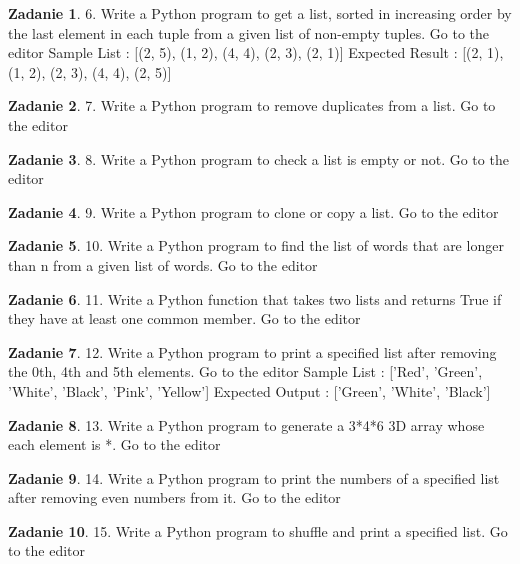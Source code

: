 \documentclass[11pt]{article}
\theoremstyle{definition}
\newtheorem{zadanie}{Zadanie}
\begin{document}
\begin{zadanie}
6. Write a Python program to get a list, sorted in increasing order by the last element in each tuple from a given list of non-empty tuples. Go to the editor
Sample List : [(2, 5), (1, 2), (4, 4), (2, 3), (2, 1)]
Expected Result : [(2, 1), (1, 2), (2, 3), (4, 4), (2, 5)]
\end{zadanie}

\begin{zadanie}
7. Write a Python program to remove duplicates from a list. Go to the editor
\end{zadanie}

\begin{zadanie}
8. Write a Python program to check a list is empty or not. Go to the editor
\end{zadanie}

\begin{zadanie}
9. Write a Python program to clone or copy a list. Go to the editor
\end{zadanie}

\begin{zadanie}
10. Write a Python program to find the list of words that are longer than n from a given list of words. Go to the editor
\end{zadanie}

\begin{zadanie}
11. Write a Python function that takes two lists and returns True if they have at least one common member. Go to the editor
\end{zadanie}

\begin{zadanie}
12. Write a Python program to print a specified list after removing the 0th, 4th and 5th elements. Go to the editor
Sample List : ['Red', 'Green', 'White', 'Black', 'Pink', 'Yellow']
Expected Output : ['Green', 'White', 'Black']
\end{zadanie}

\begin{zadanie}
13. Write a Python program to generate a 3*4*6 3D array whose each element is *. Go to the editor
\end{zadanie}

\begin{zadanie}
14. Write a Python program to print the numbers of a specified list after removing even numbers from it. Go to the editor
\end{zadanie}

\begin{zadanie}
15. Write a Python program to shuffle and print a specified list. Go to the editor
\end{zadanie}
\end{document}
